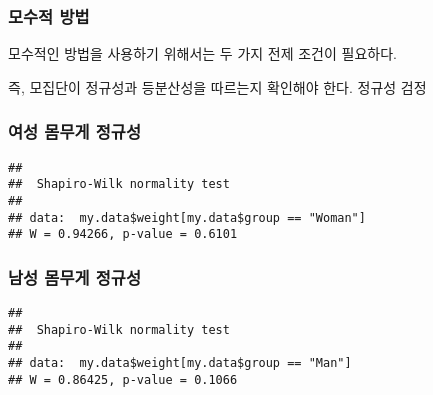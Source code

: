 \documentclass[
]{article}
\newenvironment{Shaded}{\begin{snugshade}}{\end{snugshade}}
\newcommand{\FunctionTok}[1]{\textcolor[rgb]{0.00,0.00,0.00}{#1}}
\newcommand{\NormalTok}[1]{#1}
\newcommand{\SpecialCharTok}[1]{\textcolor[rgb]{0.00,0.00,0.00}{#1}}
\newcommand{\StringTok}[1]{\textcolor[rgb]{0.31,0.60,0.02}{#1}}
\begin{document}
\hypertarget{uxbaa8uxc218uxc801-uxbc29uxbc95-2}{%
\subsubsection{모수적 방법}\label{uxbaa8uxc218uxc801-uxbc29uxbc95-2}}

모수적인 방법을 사용하기 위해서는 두 가지 전제 조건이 필요하다.

즉, 모집단이 정규성과 등분산성을 따르는지 확인해야 한다.
정규성 검정

\hypertarget{uxc5ecuxc131-uxbab8uxbb34uxac8c-uxc815uxaddcuxc131}{%
\subsubsection{여성 몸무게 정규성}\label{uxc5ecuxc131-uxbab8uxbb34uxac8c-uxc815uxaddcuxc131}}

\begin{Shaded}
\end{Shaded}

\begin{verbatim}
## 
##  Shapiro-Wilk normality test
## 
## data:  my.data$weight[my.data$group == "Woman"]
## W = 0.94266, p-value = 0.6101
\end{verbatim}

\hypertarget{uxb0a8uxc131-uxbab8uxbb34uxac8c-uxc815uxaddcuxc131}{%
\subsubsection{남성 몸무게 정규성}\label{uxb0a8uxc131-uxbab8uxbb34uxac8c-uxc815uxaddcuxc131}}

\begin{Shaded}
\end{Shaded}

\begin{verbatim}
## 
##  Shapiro-Wilk normality test
## 
## data:  my.data$weight[my.data$group == "Man"]
## W = 0.86425, p-value = 0.1066
\end{verbatim}
\end{document}
